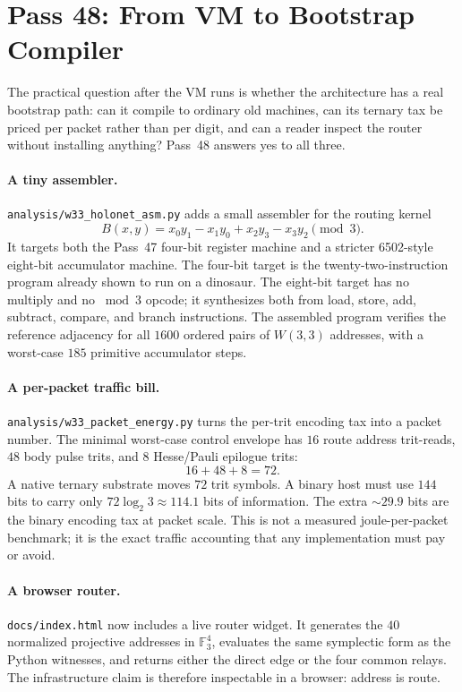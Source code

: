 \documentclass[11pt]{article}
\begin{document}
\section{Pass 48: From VM to Bootstrap Compiler}
\label{sec:pass48}
The practical question after the VM runs is whether the architecture has a real
bootstrap path: can it compile to ordinary old machines, can its ternary tax be
priced per packet rather than per digit, and can a reader inspect the router
without installing anything?  Pass~48 answers yes to all three.

\paragraph{A tiny assembler.}
\texttt{analysis/w33\_holonet\_asm.py} adds a small assembler for the routing
kernel
\[
  B(x,y)=x_0y_1-x_1y_0+x_2y_3-x_3y_2\pmod 3.
\]
It targets both the Pass~47 four-bit register machine and a stricter
6502-style eight-bit accumulator machine.  The four-bit target is the
twenty-two-instruction program already shown to run on a dinosaur.  The
eight-bit target has no multiply and no \(\bmod 3\) opcode; it synthesizes both
from load, store, add, subtract, compare, and branch instructions.  The
assembled program verifies the reference adjacency for all \(1600\) ordered
pairs of \(W(3,3)\) addresses, with a worst-case \(185\) primitive accumulator
steps.

\paragraph{A per-packet traffic bill.}
\texttt{analysis/w33\_packet\_energy.py} turns the per-trit encoding tax into a
packet number.  The minimal worst-case control envelope has \(16\) route
address trit-reads, \(48\) body pulse trits, and \(8\) Hesse/Pauli epilogue
trits:
\[
  16+48+8=72.
\]
A native ternary substrate moves \(72\) trit symbols.  A binary host must use
\(144\) bits to carry only \(72\log_2 3\approx114.1\) bits of information.
The extra \(\sim29.9\) bits are the binary encoding tax at packet scale.  This
is not a measured joule-per-packet benchmark; it is the exact traffic
accounting that any implementation must pay or avoid.

\paragraph{A browser router.}
\texttt{docs/index.html} now includes a live router widget.  It generates the
\(40\) normalized projective addresses in \(\mathbb F_3^4\), evaluates the same
symplectic form as the Python witnesses, and returns either the direct edge or
the four common relays.  The infrastructure claim is therefore inspectable in a
browser: address is route.
\end{document}
